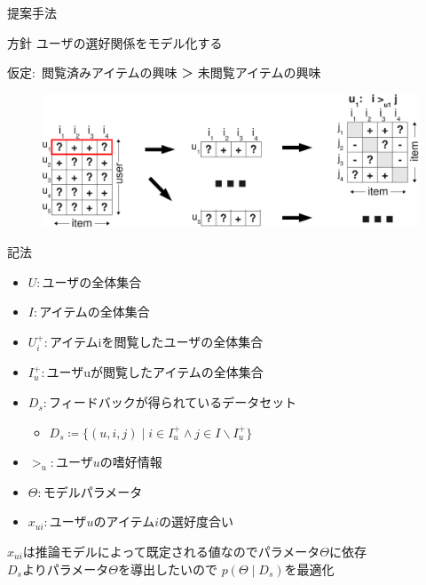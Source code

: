 \documentclass[aspectratio=43, dvipdfmx, 11pt]{beamer} %
\begin{document}
\begin{frame}{提案手法}
    \begin{block}{方針}
        ユーザの選好関係をモデル化する\\
    \end{block}

    仮定$\colon$ 閲覧済みアイテムの興味 ＞ 未閲覧アイテムの興味
        \begin{figure}[H]
        \begin{center}
        \includegraphics[scale=0.55,pagebox=cropbox,clip]{new-crop.pdf}
        \end{center}
        \end{figure}
\end{frame}

\begin{frame}{記法}
    \begin{itemize}
    \item $U \colon \text{ユーザの全体集合}$\\
    \item $I \colon \text{アイテムの全体集合}$\\
    \item $U^+_i \colon \text{アイテムiを閲覧したユーザの全体集合}$\\
    \item $I^+_u \colon \text{ユーザuが閲覧したアイテムの全体集合}$\\
    \item $D_s \colon \text{フィードバックが得られているデータセット}$\\
    \begin{itemize}
        \item $D_s \coloneqq \{(u,i,j) \mid i \in I^+_u \land j \in I\backslash I^+_u \}$
    \end{itemize}
    \item $>_u \colon \text{ユーザ}u\text{の嗜好情報}$\\
    \item $\Theta \colon \text{モデルパラメータ}$\\
    \item $x_{ui} \colon \text{ユーザ}u\text{のアイテム}i\text{の選好度合い}$
    \end{itemize}

$x_{ui}$は推論モデルによって既定される値なのでパラメータ$\Theta$に依存\\
\vspace{5mm}
$D_s$よりパラメータ$\Theta$を導出したいので $p(\Theta \mid D_s)$を最適化
\end{frame}
\end{document}
